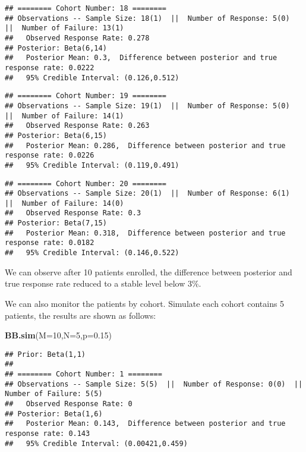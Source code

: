 \documentclass[]{article}
\newenvironment{Shaded}{\begin{snugshade}}{\end{snugshade}}
\newcommand{\KeywordTok}[1]{\textcolor[rgb]{0.13,0.29,0.53}{\textbf{{#1}}}}
\newcommand{\DataTypeTok}[1]{\textcolor[rgb]{0.13,0.29,0.53}{{#1}}}
\newcommand{\DecValTok}[1]{\textcolor[rgb]{0.00,0.00,0.81}{{#1}}}
\newcommand{\FloatTok}[1]{\textcolor[rgb]{0.00,0.00,0.81}{{#1}}}
\newcommand{\NormalTok}[1]{{#1}}
\begin{document}
\begin{verbatim}
## ======== Cohort Number: 18 ======== 
## Observations -- Sample Size: 18(1)  ||  Number of Response: 5(0)  ||  Number of Failure: 13(1)
##   Observed Response Rate: 0.278
## Posterior: Beta(6,14) 
##   Posterior Mean: 0.3,  Difference between posterior and true response rate: 0.0222
##   95% Credible Interval: (0.126,0.512)
\end{verbatim}

\begin{verbatim}
## ======== Cohort Number: 19 ======== 
## Observations -- Sample Size: 19(1)  ||  Number of Response: 5(0)  ||  Number of Failure: 14(1)
##   Observed Response Rate: 0.263
## Posterior: Beta(6,15) 
##   Posterior Mean: 0.286,  Difference between posterior and true response rate: 0.0226
##   95% Credible Interval: (0.119,0.491)
\end{verbatim}

\begin{verbatim}
## ======== Cohort Number: 20 ======== 
## Observations -- Sample Size: 20(1)  ||  Number of Response: 6(1)  ||  Number of Failure: 14(0)
##   Observed Response Rate: 0.3
## Posterior: Beta(7,15) 
##   Posterior Mean: 0.318,  Difference between posterior and true response rate: 0.0182
##   95% Credible Interval: (0.146,0.522)
\end{verbatim}


We can observe after 10 patients enrolled, the difference between
posterior and true response rate reduced to a stable level below 3\%.

We can also monitor the patients by cohort. Simulate each cohort
contains 5 patients, the results are shown as follows:

\begin{Shaded}
\begin{Highlighting}[]
\KeywordTok{BB.sim}\NormalTok{(}\DataTypeTok{M=}\DecValTok{10}\NormalTok{,}\DataTypeTok{N=}\DecValTok{5}\NormalTok{,}\DataTypeTok{p=}\FloatTok{0.15}\NormalTok{)}
\end{Highlighting}
\end{Shaded}

\begin{verbatim}
## Prior: Beta(1,1) 
## 
## ======== Cohort Number: 1 ======== 
## Observations -- Sample Size: 5(5)  ||  Number of Response: 0(0)  ||  Number of Failure: 5(5)
##   Observed Response Rate: 0
## Posterior: Beta(1,6) 
##   Posterior Mean: 0.143,  Difference between posterior and true response rate: 0.143
##   95% Credible Interval: (0.00421,0.459)
\end{verbatim}
\end{document}
